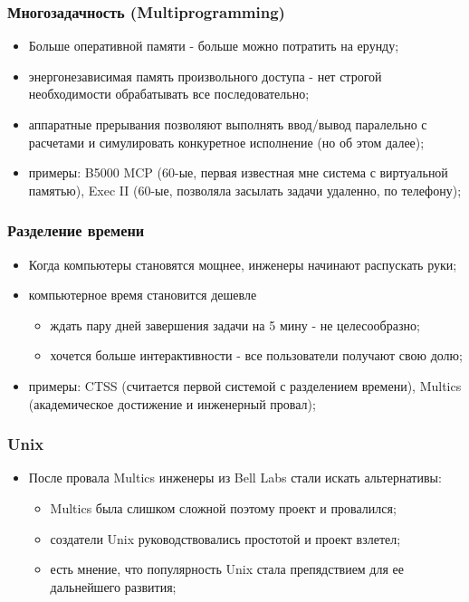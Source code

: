 \begin{frame}
\frametitle{Многозадачность (Multiprogramming)}
\begin{itemize}
  \item Больше оперативной памяти - больше можно потратить на ерунду;
  \item энергонезависимая память произвольного доступа - нет строгой
  необходимости обрабатывать все последовательно;
  \item аппаратные прерывания позволяют выполнять ввод/вывод паралельно с
  расчетами и симулировать конкуретное исполнение (но об этом далее);
  \item примеры: B5000 MCP (60-ые, первая известная мне система с виртуальной
  памятью), Exec II (60-ые, позволяла засылать задачи удаленно, по телефону);
\end{itemize}
\end{frame}

\begin{frame}
\frametitle{Разделение времени}
\begin{itemize}
  \item Когда компьютеры становятся мощнее, инженеры начинают распускать руки;
  \item компьютерное время становится дешевле
  \begin{itemize}
    \item ждать пару дней завершения задачи на 5 мину - не целесообразно;
    \item хочется больше интерактивности - все пользователи получают свою долю;
  \end{itemize}
  \item примеры: CTSS (считается первой системой с разделением времени),
  Multics (академическое достижение и инженерный провал);
\end{itemize}
\end{frame}

\begin{frame}
\frametitle{Unix}
\begin{itemize}
  \item После провала Multics инженеры из Bell Labs стали искать альтернативы:
  \begin{itemize}
    \item Multics была слишком сложной поэтому проект и провалился;
    \item создатели Unix руководствовались простотой и проект взлетел;
    \item есть мнение, что популярность Unix стала препядствием для ее
    дальнейшего развития;
  \end{itemize}
\end{itemize}
\end{frame}

